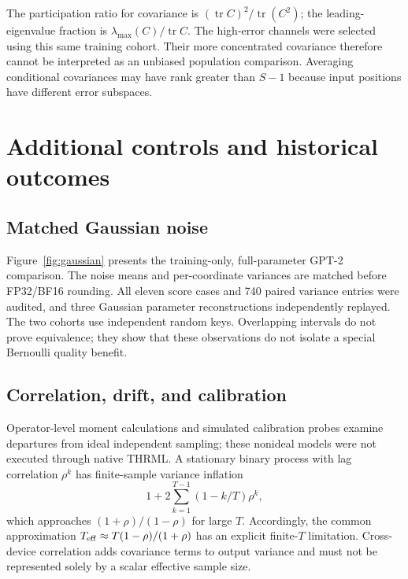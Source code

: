 \documentclass[11pt]{article}
\begin{document}
The participation ratio for covariance is $(\operatorname{tr}C)^2/\operatorname{tr}(C^2)$; the leading-eigenvalue fraction is $\lambda_{\max}(C)/\operatorname{tr}C$. The high-error channels were selected using this same training cohort. Their more concentrated covariance therefore cannot be interpreted as an unbiased population comparison. Averaging conditional covariances may have rank greater than $S-1$ because input positions have different error subspaces.

\section{Additional controls and historical outcomes}
\subsection{Matched Gaussian noise}
Figure~\ref{fig:gaussian} presents the training-only, full-parameter GPT-2 comparison. The noise means and per-coordinate variances are matched before FP32/BF16 rounding. All eleven score cases and 740 paired variance entries were audited, and three Gaussian parameter reconstructions independently replayed. The two cohorts use independent random keys. Overlapping intervals do not prove equivalence; they show that these observations do not isolate a special Bernoulli quality benefit.


\subsection{Correlation, drift, and calibration}
Operator-level moment calculations and simulated calibration probes examine departures from ideal independent sampling; these nonideal models were not executed through native THRML. A stationary binary process with lag correlation $\rho^k$ has finite-sample variance inflation
\begin{equation}
 1+2\sum_{k=1}^{T-1}(1-k/T)\rho^k,
\end{equation}
which approaches $(1+\rho)/(1-\rho)$ for large $T$. Accordingly, the common approximation $T_{\rm eff}\approx T(1-\rho)/(1+\rho)$ has an explicit finite-$T$ limitation. Cross-device correlation adds covariance terms to output variance and must not be represented solely by a scalar effective sample size.
\end{document}
